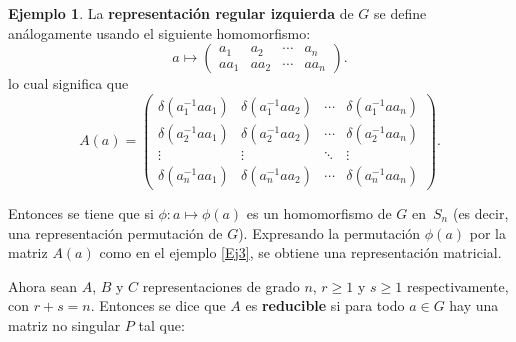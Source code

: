 \documentclass[12pt]{book}
\theoremstyle{definition}
\newtheorem{example}[theorem]{Ejemplo}
\newcounter{in}
\begin{document}
\begin{example}
  La \textbf{representación regular izquierda} de $G$ se define
  análogamente usando el siguiente homomorfismo:
  \begin{equation*}
    a \mapsto
    \begin{pmatrix}
      a_{1} & a_{2} & \cdots  & a_{n}\\ 
      aa_{1} & aa_{2} & \cdots & aa_{n}
    \end{pmatrix}.
  \end{equation*}
  lo cual significa que
  \begin{equation}
    \label{eq:8}
    A\left(a\right) = 
    \begin{pmatrix}
      \delta\left(a_{1}^{-1}aa_{1}\right) & \delta\left(a_{1}^{-1}aa_{2}\right) & \cdots  & \delta\left(a_{1}^{-1}aa_{n}\right)\\
      \delta\left(a_{2}^{-1}aa_{1}\right) & \delta\left(a_{2}^{-1}aa_{2}\right) & \cdots  & \delta\left(a_{2}^{-1}aa_{n}\right)\\ 
      \vdots & \vdots & \ddots & \vdots\\
      \delta\left(a_{n}^{-1}aa_{1}\right) & \delta\left(a_{n}^{-1}aa_{2}\right) & \cdots  & \delta\left(a_{n}^{-1}aa_{n}\right)
    \end{pmatrix}
    .
  \end{equation}
\end{example}

Entonces se tiene que si $\phi \colon a \mapsto \phi\left(a\right)$ es
un homomorfismo de $G$ en~$S_{n}$ (es decir, una representación
permutación de $G$). Expresando la permutación $\phi\left(a\right)$
por la matriz $A\left(a\right)$ como en el ejemplo \ref{Ej3}, se
obtiene una representación matricial.

Ahora sean $A$, $B$ y $C$ representaciones de grado $n$,
$r \geq 1$ y $s \geq 1$ respectivamente, con $r+s=n$. Entonces se dice
que $A$ es \textbf{reducible} si para todo $a \in G$ hay una matriz no
singular $P$ tal que:
\end{document}
